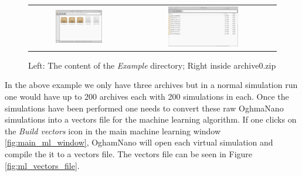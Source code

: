 \begin{figure}
\centering
\begin{tabular}{ c c }

\includegraphics[width=0.5\textwidth,height=0.4\textwidth]{./images/ml/output_dir.png}

&
\includegraphics[width=0.5\textwidth,height=0.4\textwidth]{./images/ml/zipfile.png}
\\
\end{tabular}
\caption{Left: The content of the \emph{Example} directory; Right inside archive0.zip}
\label{fig:ml_output_dir}
\end{figure}


In the above example we only have three archives but in a normal simulation run one would have up to 200 archives each with 200 simulations in each. Once the simulations have been performed one needs to convert these raw OghmaNano simulations into a vectors file for the machine learning algorithm.  If one clicks on the \emph{Build vectors} icon in the main machine learning window \ref{fig:main_ml_window}, OghamNano will open each virtual simulation and compile the it to a vectors file. The vectors file can be seen in Figure \ref{fig:ml_vectors_file}. 

